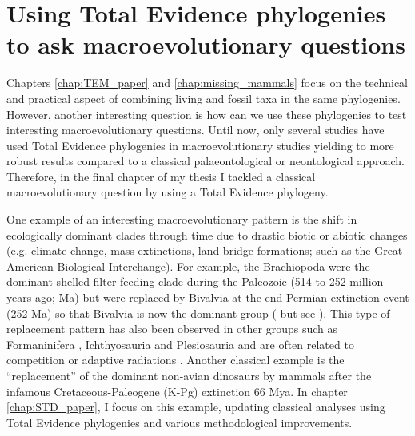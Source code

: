 \section{Using Total Evidence phylogenies to ask macroevolutionary questions}
Chapters \ref{chap:TEM_paper} and \ref{chap:missing_mammals} focus on the technical and practical aspect of combining living and fossil taxa in the same phylogenies.
However, another interesting question is how can we use these phylogenies to test interesting macroevolutionary questions.
Until now, only several studies have used Total Evidence phylogenies in macroevolutionary studies \citep[e.g.][]{Wood01032013,slaterphylogenetic2013,beckancient2014,Dembo2015} %
yielding to more robust results compared to a classical palaeontological or neontological approach.
Therefore, in the final chapter of my thesis I tackled a classical macroevolutionary question by using a Total Evidence phylogeny. 

One example of an interesting macroevolutionary pattern is the shift in ecologically dominant clades through time due to drastic biotic or abiotic changes (e.g. climate change, mass extinctions, land bridge formations; such as the Great American Biological Interchange). %
For example, the Brachiopoda were the dominant shelled filter feeding clade during the Paleozoic (514 to 252 million years ago; Ma) but were replaced by Bivalvia at the end Permian extinction event (252 Ma) so that Bivalvia is now the dominant group (\citealt{Sepkiski1981,CLAPHAM01102006,Liow2015} but see \citealt{Payne22052014}).
This type of replacement pattern has also been observed in other groups such as Formaninifera \citep{Coxall01042006}, Ichthyosauria \citep{thorneresetting2011} and Plesiosauria \citep{bensonfaunal2014} and are often related to competition \citep{brusatte50} or adaptive radiations \citep{Losos2010}.
Another classical example is the ``replacement'' of the dominant non-avian dinosaurs by mammals after the infamous Cretaceous-Paleogene (K-Pg) extinction 66 Mya.
In chapter \ref{chap:STD_paper}, I focus on this example, updating classical analyses using Total Evidence phylogenies and various methodological improvements.

